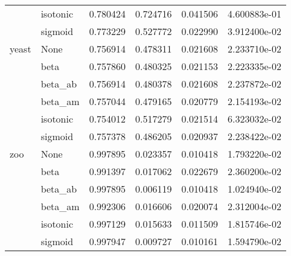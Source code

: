 \begin{tabular}{llrrrr}
        & isotonic &  0.780424 &  0.724716 &  0.041506 &  4.600883e-01 \\
        & sigmoid &  0.773229 &  0.527772 &  0.022990 &  3.912400e-02 \\
yeast & None &  0.756914 &  0.478311 &  0.021608 &  2.233710e-02 \\
        & beta &  0.757860 &  0.480325 &  0.021153 &  2.223335e-02 \\
        & beta\_ab &  0.756914 &  0.480378 &  0.021608 &  2.237872e-02 \\
        & beta\_am &  0.757044 &  0.479165 &  0.020779 &  2.154193e-02 \\
        & isotonic &  0.754012 &  0.517279 &  0.021514 &  6.323032e-02 \\
        & sigmoid &  0.757378 &  0.486205 &  0.020937 &  2.238422e-02 \\
zoo & None &  0.997895 &  0.023357 &  0.010418 &  1.793220e-02 \\
        & beta &  0.991397 &  0.017062 &  0.022679 &  2.360200e-02 \\
        & beta\_ab &  0.997895 &  0.006119 &  0.010418 &  1.024940e-02 \\
        & beta\_am &  0.992306 &  0.016606 &  0.020074 &  2.312004e-02 \\
        & isotonic &  0.997129 &  0.015633 &  0.011509 &  1.815746e-02 \\
        & sigmoid &  0.997947 &  0.009727 &  0.010161 &  1.594790e-02 \\
\bottomrule
\end{tabular}
